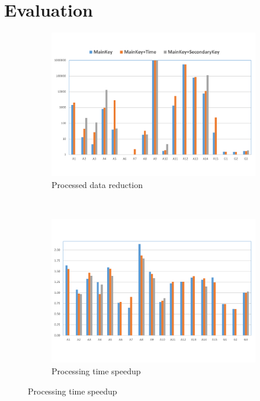 \section{Evaluation}

\begin{figure}
\centering

\begin{subfigure}[t]{\columnwidth}
\includegraphics[clip, trim=0.8cm 1.5cm 0.9cm 2.15cm,
width=\columnwidth]{graphs/data_red.pdf}
\caption{Processed data reduction}
\label{fig:data_red}
\end{subfigure}
~
\begin{subfigure}[t]{\columnwidth}
\includegraphics[clip, trim=0.8cm 2cm 0.9cm 2cm,
width=\columnwidth]{graphs/processing_red.pdf}
\caption{Processing time speedup}
\label{fig:processing_red}

\end{subfigure}
\end{figure}
